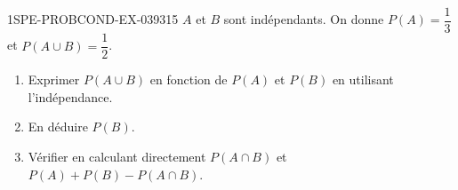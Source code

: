 \begin{exercice}{1SPE-PROBCOND-EX-039}{3}{15}
$A$ et $B$ sont indépendants. On donne $P(A) = \dfrac{1}{3}$ et $P(A \cup B) = \dfrac{1}{2}$.

\begin{enumerate}
  \item Exprimer $P(A \cup B)$ en fonction de $P(A)$ et $P(B)$ en utilisant l'indépendance.
  \item En déduire $P(B)$.
  \item Vérifier en calculant directement $P(A \cap B)$ et $P(A) + P(B) - P(A \cap B)$.
\end{enumerate}
\end{exercice}
